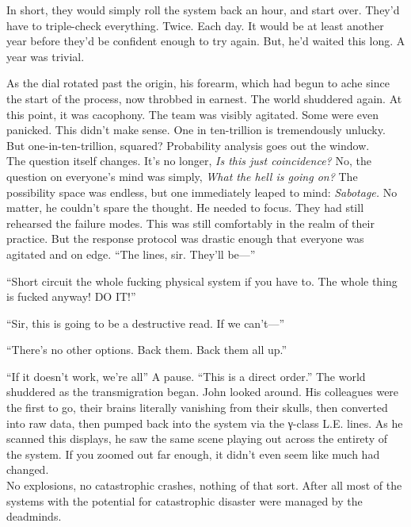 In short, they would simply roll the system back an hour, and start over. They’d have to triple-check everything. Twice. Each day. It would be at least another year before they’d be confident enough to try again. But, he’d waited this long. A year was trivial.

As the dial rotated past the origin, his forearm, which had begun to ache since the start of the process, now throbbed in earnest.
\simpleline
The world shuddered again.
\simpleline
At this point, it was cacophony. The team was visibly agitated. Some were even panicked. This didn’t make sense.
\SmallVSpace
One in ten-trillion is tremendously unlucky. But one-in-ten-trillion, squared? Probability analysis goes out the window.\\The question itself changes. It’s no longer, \emph{Is this just coincidence?} No, the question on everyone’s mind was simply, \emph{What the hell is going on?}  The possibility space was endless, but one immediately leaped to mind: \emph{Sabotage.} No matter, he couldn’t spare the thought. He needed to focus. They had still rehearsed the failure modes. This was still comfortably in the realm of their practice.  But the response protocol was drastic enough that everyone was agitated and on edge.
\SmallVSpace
“The lines, sir. They’ll be\mbox{---}”

“Short circuit the whole fucking physical system if you have to. The whole thing is fucked anyway! DO IT!”

“Sir, this is going to be a destructive read. If we can’t\mbox{---}”

“There’s no other options. Back them. Back them all up.”

“If it doesn’t work, we’re all{\el}”
\SomeVSpace
A pause.
\SomeVSpace
“This is a direct order.”
\simpleline
The world shuddered as the transmigration began.
\simpleline
John looked around. His colleagues were the first to go, their brains literally vanishing from their skulls, then converted into raw data, then pumped back into the system via the γ-class L.E. lines. As he scanned this displays, he saw the same scene playing out across the entirety of the system. If you zoomed out far enough, it didn’t even seem like much had changed.\\No explosions, no catastrophic crashes, nothing of that sort. After all most of the systems with the potential for catastrophic disaster were managed by the deadminds.

